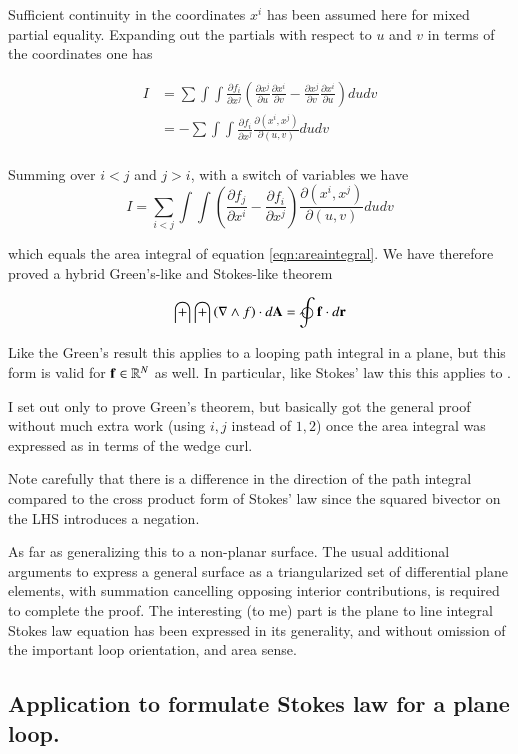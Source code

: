 \documentclass{article}
\newcommand{\grad}[0]{\nabla}
\newcommand{\PD}[2]{\frac{\partial {#2}}{\partial {#1}}}
\newcommand{\Rm}[1]{\mathbb{R}^{#1}}
\begin{document}
Sufficient continuity in the coordinates $x^i$ has been assumed here for mixed partial equality.  Expanding out
the partials with respect to $u$ and $v$ in terms of the coordinates one has

\begin{align*}
I
&=
\sum \int\int 
\PD{x^j}{f_i} 
\left(
\PD{u}{x^j}
\PD{v}{x^i}
-
\PD{v}{x^j}
\PD{u}{x^i}
\right) 
du dv \\
&= -\sum \int\int \PD{x^j}{f_i} \PD{(u,v)}{(x^i,x^j)} du dv \\
\end{align*}

Summing over $i<j$ and $j>i$, with a switch of variables we have
\begin{equation}
I
= 
\sum_{i<j} \int\int 
\left(
\PD{x^i}{f_j}
-\PD{x^j}{f_i}
\right)
\PD{(u,v)}{(x^i,x^j)} du dv 
\end{equation}

which equals the area integral of equation \ref{eqn:areaintegral}.  We have therefore proved a hybrid Green's-like
and Stokes-like theorem

\begin{equation}\label{eqn:stokesplane}
\int\int \left(\grad \wedge f\right) \cdot d\BA = \ointclockwise \Bf \cdot d\Br
\end{equation}

Like the  Green's result this applies to a looping path integral in a plane, but this
form is valid for $\Bf \in \Rm{N}$ as well.  In particular, like Stokes' law this this applies to .

I set out only to prove
Green's theorem, but basically got the general proof without much extra work (using $i,j$ instead of $1,2$)
once the area integral was expressed as in terms of the wedge curl.

Note carefully that there is a
difference in the direction of the path integral compared to the cross product form of Stokes' law since
the squared bivector on the LHS introduces a negation.

As far as generalizing this to a non-planar surface.
The usual additional arguments to express a general 
surface as a triangularized set of differential plane elements, with summation cancelling opposing interior
contributions, is required to complete the proof.  The interesting (to me) part is the
plane to line integral Stokes law equation has been expressed in its  generality, and without
omission of the important loop orientation, and area sense.

\subsection{ Application to formulate Stokes law for a plane loop. }
\end{document}
